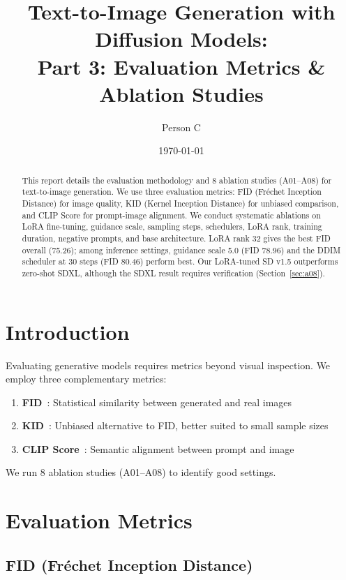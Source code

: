 \documentclass[11pt]{article}
\title{Text-to-Image Generation with Diffusion Models:\\
{\large Part 3: Evaluation Metrics \& Ablation Studies}}
\author{Person C}
\date{\today}
\begin{document}
\maketitle

\begin{abstract}
This report details the evaluation methodology and 8 ablation studies (A01--A08) for text-to-image generation. We use three evaluation metrics: FID (Fr\'echet Inception Distance) for image quality, KID (Kernel Inception Distance) for unbiased comparison, and CLIP Score for prompt-image alignment. We conduct systematic ablations on LoRA fine-tuning, guidance scale, sampling steps, schedulers, LoRA rank, training duration, negative prompts, and base architecture. LoRA rank 32 gives the best FID overall (75.26); among inference settings, guidance scale 5.0 (FID 78.96) and the DDIM scheduler at 30 steps (FID 80.46) perform best. Our LoRA-tuned SD v1.5 outperforms zero-shot SDXL, although the SDXL result requires verification (Section~\ref{sec:a08}).
\end{abstract}

\section{Introduction}

Evaluating generative models requires metrics beyond visual inspection. We employ three complementary metrics:

\begin{enumerate}
    \item \textbf{FID}~\cite{heusel2017gans}: Statistical similarity between generated and real images
    \item \textbf{KID}~\cite{binkowski2018demystifying}: Unbiased alternative to FID, better suited to small sample sizes
    \item \textbf{CLIP Score}~\cite{hessel2021clipscore}: Semantic alignment between prompt and image
\end{enumerate}

We run 8 ablation studies (A01--A08) to identify good settings.

\section{Evaluation Metrics}

\subsection{FID (Fr\'echet Inception Distance)}
\end{document}
